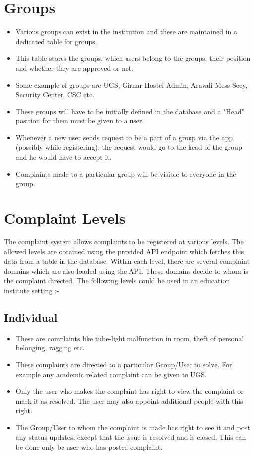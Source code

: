 \documentclass[12pt]{article}
\begin{document}
\section{Groups}
\begin{itemize}
\item Various groups can exist in the institution and these are maintained in a dedicated table for groups.
\item This table stores the groups, which users belong to the groups, their position and whether they are approved or not.
\item Some example of groups are UGS, Girnar Hostel Admin, Aravali Mess Secy, Security Center, CSC etc.
\item These groups will have to be initially defined in the database and a "Head" position for them must be given to a user.
\item Whenever a new user sends request to be a part of a group via the app (possibly while registering), the request would go to the head of the group and he would have to accept it.
\item Complaints made to a particular group will be visible to everyone in the group.
\end{itemize}

\section{Complaint Levels}
The complaint system allows complaints to be registered at various levels. The allowed levels are obtained using the provided API endpoint which fetches this data from a table in the database. Within each level, there are several complaint domains which are also loaded using the API. These domains decide to whom is the complaint directed. The following levels could be used in an education institute setting :-
\subsection{Individual}
\begin{itemize}
\setlength\itemsep{-0.4em}
\item These are complaints like tube-light malfunction in room, theft of personal belonging, ragging etc.
\item These complaints are directed to a particular Group/User to solve. For example any academic related complaint  can be given to UGS.
\item Only the user who makes the complaint has right to view the complaint or mark it as resolved. The user may also appoint additional people with this right.
\item The Group/User to whom the complaint is made has right to see it and post any status updates, except that the issue is resolved and is closed. This can be done only be user who has posted complaint.
\end{itemize}
\end{document}
